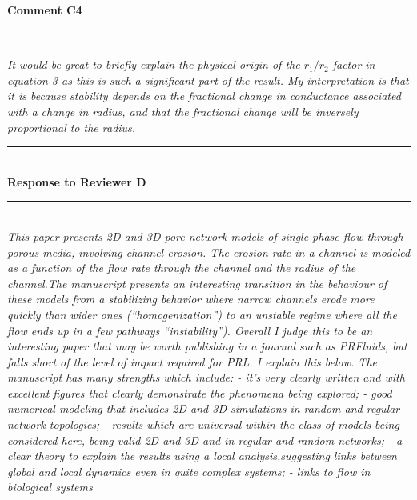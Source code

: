 \documentclass{article}
\newcommand{\Hline}{\rule{\linewidth}{.1mm}}
\newcommand{\Question}[1]{\noindent \color{black}\emph{#1}\normalcolor}
\newcommand{\Answer}[1]{\noindent {\color{blue}{ #1}}\normalcolor}
\newcommand{\AnswerQ}[1]{\noindent {\footnotesize {\color{blue}{ #1}}}\normalcolor}
\begin{document}
\vspace{0.5cm}
\textbf{Comment C4}
\noindent \vspace{-0.2cm}\\ \Hline\\

\Question{It would be great to briefly explain the physical origin of the
$r_1/r_2$ factor in equation 3 as this is such a significant part of the
result. My interpretation is that it is because stability depends on
the fractional change in conductance associated with a change in
radius, and that the fractional change will be inversely proportional
to the radius.\newline}

\Answer{We thank the reviewer for their valuable recommendations. The physical origin the scale-free criteria $r_1/r_2$ turns out to be the result of power law dependence of conductance with respect to radius, meaning that our homogenization condition can be generalized to nonlaminar flow as well. The relevant part is attached. }
\AnswerQ{
\begin{quote}
    ``In fact, this condition will hold for nonlaminar flow as long as $C\propto r^k (k > 0)$. The power law dependence of conductance with respect to radius leads to the scale-free criteria $r_1/r_2$. ''   
\end{quote}
}

\newpage 
\vspace{10 mm}
\noindent
\Hline \\
\textbf{Response to Reviewer D} \\
\Hline
\\

\Question{This paper presents 2D and 3D pore-network models of single-phase flow through porous media, involving channel erosion. The erosion rate in a channel is modeled as a function of the flow rate through the channel and the radius of the channel.The manuscript presents an interesting transition in the behaviour of these models from a stabilizing behavior where narrow channels erode more quickly than wider ones (``homogenization'') to an unstable regime where all the flow ends up in a few pathways ``instability''). Overall I judge this to be an interesting paper that may be worth publishing in a journal such as PRFluids, but falls short of the level of impact required for PRL. I explain this below.  The manuscript has many strengths which include: - it's very clearly written and with excellent figures that clearly demonstrate the phenomena being explored; - good numerical modeling that includes 2D and 3D simulations in random and regular network topologies; - results which are universal within the class of models being considered here, being valid 2D and 3D and in regular and random networks; - a clear theory to explain the results using a local analysis,suggesting links between global and local dynamics even in quite complex systems; - links to flow in biological systems
\newline}
\end{document}
